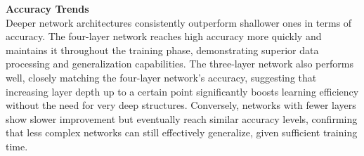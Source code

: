 \documentclass[11pt,a4paper]{article}
\begin{document}
\noindent \textbf{Accuracy Trends} \\
Deeper network architectures consistently outperform shallower ones in terms of accuracy. The four-layer network reaches high accuracy more
quickly and maintains it throughout the training phase, demonstrating superior data processing and generalization capabilities. The three-layer
network also performs well, closely matching the four-layer network’s accuracy, suggesting that increasing layer depth up to a certain point
significantly boosts learning efficiency without the need for very deep structures. Conversely, networks with fewer layers show slower improvement
but eventually reach similar accuracy levels, confirming that less complex networks can still effectively generalize, given sufficient training time.
\end{document}
